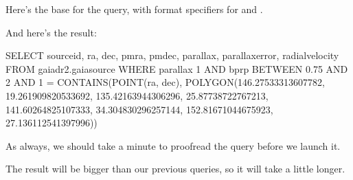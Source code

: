 \documentclass[letterpaper,10pt,english]{sphinxmanual}
\begin{document}
Here’s the base for the query, with format specifiers for  and .

\begin{sphinxVerbatim}[commandchars=\\\{\}]
  
\end{sphinxVerbatim}

And here’s the result:

\begin{sphinxVerbatim}[commandchars=\\\{\}]
   
\end{sphinxVerbatim}

\begin{sphinxVerbatim}[commandchars=\\\{\}]
SELECT source\PYGZus{}id, ra, dec, pmra, pmdec, parallax, parallax\PYGZus{}error, radial\PYGZus{}velocity
FROM gaiadr2.gaia\PYGZus{}source
WHERE parallax \PYGZlt{} 1
  AND bp\PYGZus{}rp BETWEEN \PYGZhy{}0.75 AND 2 
  AND 1 = CONTAINS(POINT(ra, dec), 
                   POLYGON(146.27533313607782, 19.261909820533692, 135.42163944306296, 25.87738722767213, 141.60264825107333, 34.304830296257144, 152.81671044675923, 27.136112541397996))
\end{sphinxVerbatim}

As always, we should take a minute to proof\sphinxhyphen{}read the query before we launch it.

The result will be bigger than our previous queries, so it will take a little longer.

\begin{sphinxVerbatim}[commandchars=\\\{\}]
  
\end{sphinxVerbatim}
\end{document}
